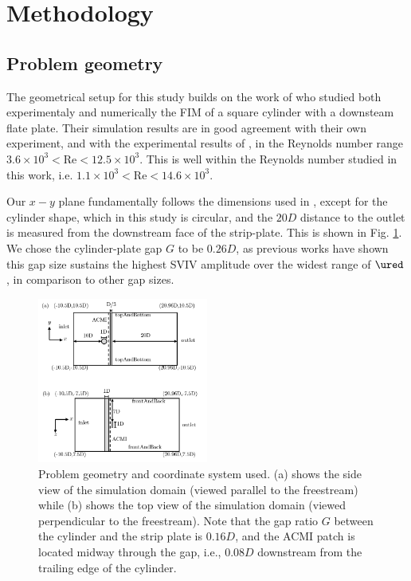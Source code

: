 \documentclass[a4paper,fleqn]{cas-sc}
\begin{document}
\section{Methodology} \label{sec:method}
\subsection{Problem geometry} \label{ssec:probGeo}
The geometrical setup for this study builds on the work of \citet{Maruai2017,Maruai2018} who studied both experimentaly and numerically the FIM of a square cylinder with a downsteam flate plate. Their simulation results are in good agreement with their own experiment, and with the experimental results of \citet{Kawabata2013}, in the Reynolds number range $3.6\times10^{3}<\text{Re}<12.5\times10^{3}$. This is well within the Reynolds number studied in this work, i.e. $1.1\times10^{3}<\text{Re}<14.6\times10^{3}$.

Our $x-y$ plane fundamentally follows the dimensions used in \citet{Maruai2017,Maruai2018}, except for the cylinder shape, which in this study is circular, and the $20D$ distance to the outlet is measured from the downstream face of the strip-plate. This is shown in Fig. \ref{fig:problemGeometry}. We chose the cylinder-plate gap $G$ to be $0.26D$, as previous works have shown this gap size sustains the highest SVIV amplitude over the widest range of $\ured$, in comparison to other gap sizes.

\begin{figure}
  \centering
  \includegraphics[width=0.5\textwidth]{figs/figure2}
  \caption{Problem geometry and coordinate system used. (a) shows the side view of the simulation domain (viewed parallel to the freestream) while (b) shows the top view of the simulation domain (viewed perpendicular to the freestream). Note that the gap ratio $G$ between the cylinder and the strip plate is $0.16D$, and the ACMI patch is located midway through the gap, i.e., $0.08D$ downstream from the trailing edge of the cylinder.}
  \label{fig:problemGeometry}
\end{figure}
\end{document}
